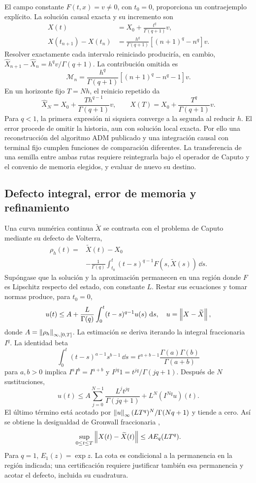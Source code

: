 El campo constante \(F(t,x)=v\ne0\), con \(t_0=0\), proporciona un
contraejemplo explícito. La solución causal exacta y su incremento son
\begin{align*}
 X(t)&=X_0+\frac{t^q}{\Gamma(q+1)}v,\\
 X(t_{n+1})-X(t_n)
 &=\frac{h^q}{\Gamma(q+1)}[(n+1)^q-n^q]v.
\end{align*}
Resolver exactamente cada intervalo reiniciado produciría, en cambio,
\(\widehat X_{n+1}-\widehat X_n=h^qv/\Gamma(q+1)\). La contribución omitida
es
\[
 \mathcal M_n=\frac{h^q}{\Gamma(q+1)}
               [(n+1)^q-n^q-1]v.
\]
En un horizonte fijo \(T=Nh\), el reinicio repetido da
\[
 \widehat X_N=X_0+\frac{Th^{q-1}}{\Gamma(q+1)}v,
 \qquad
 X(T)=X_0+\frac{T^q}{\Gamma(q+1)}v.
\]
Para \(q<1\), la primera expresión ni siquiera converge a la segunda al
reducir \(h\). El error procede de omitir la historia, aun con solución
local exacta. Por ello una reconstrucción del algoritmo ADM publicado y una
integración causal con terminal fijo cumplen funciones de comparación
diferentes. La transferencia de una semilla entre ambas rutas requiere
reintegrarla bajo el operador de Caputo y el convenio de memoria elegidos,
y evaluar de nuevo su destino.

\subsection{Defecto integral, error de memoria y refinamiento}
\label{bre:num:error}

Una curva numérica continua $\widetilde X$ se contrasta con el problema de
Caputo mediante su defecto de Volterra,
\begin{equation}
 \begin{split}
 \rho_h(t)={}&\widetilde X(t)-X_0\\
 &-\frac1{\Gamma(q)}\int_{t_0}^{t}
       (t-s)^{q-1}F(s,\widetilde X(s))\,\dd s.
 \end{split}
 \label{bre:num:defecto}
\end{equation}
Supóngase que la solución y la aproximación permanecen en una región donde
$F$ es Lipschitz respecto del estado, con constante $L$. Restar sus
ecuaciones y tomar normas produce, para $t_0=0$,
\[
 u(t)\leq A+\frac L{\Gamma(q)}\int_0^t(t-s)^{q-1}u(s)\,\,\mathrm d s,
 \quad u=\left\lVert X-\widetilde X\right\rVert,
\]
donde $A=\left\lVert\rho_h\right\rVert_{\infty,[0,T]}$. La estimación se deriva iterando
la integral fraccionaria $I^q$. La identidad beta
\[
 \int_0^t(t-s)^{a-1}s^{b-1}\,\dd s
 =t^{a+b-1}\frac{\Gamma(a)\Gamma(b)}{\Gamma(a+b)}
\]
para $a,b>0$ implica $I^aI^b=I^{a+b}$ y
$I^{jq}1=t^{jq}/\Gamma(jq+1)$. Después de $N$ sustituciones,
\[
 u(t)\leq A\sum_{j=0}^{N-1}\frac{L^jt^{jq}}{\Gamma(jq+1)}
             +L^N(I^{Nq}u)(t).
\]
El último término está acotado por
$\left\lVert u\right\rVert_\infty(LT^q)^N/\Gamma(Nq+1)$ y tiende a cero. Así se obtiene
la desigualdad de Gronwall fraccionaria \cite{Gomoyunov2018Convex},
\begin{equation}
 \sup_{0\leq t\leq T}\left\lVert X(t)-\widetilde X(t)\right\rVert
 \leq A E_q(LT^q).
 \label{bre:num:gronwall}
\end{equation}
Para $q=1$, $E_1(z)=\exp z$. La cota es condicional a la permanencia en
la región indicada; una certificación requiere justificar también esa
permanencia y acotar el defecto, incluida su cuadratura.

